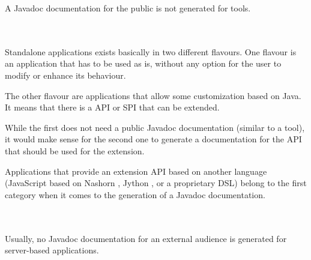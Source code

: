 A Javadoc documentation for the public is not generated for tools.

\paragraph{}\

Standalone applications exists basically in two different flavours. One flavour is an application that has to be used as is, without any option for the user to modify or enhance its behaviour. 

The other flavour are applications that allow some customization based on Java. It means that there is a API or SPI that can be extended.

While the first does not need a public Javadoc documentation (similar to a tool), it would make sense for the second one to generate a documentation for the API that should be used for the extension.

Applications that provide an extension API based on another language (JavaScript based on Nashorn \autocite{Nashorn}, Jython \autocite{Jython,Jython:GitHub}, or a proprietary DSL) belong to the first category when it comes to the generation of a Javadoc documentation.

\renewcommand{\cellalign}{tl}

\renewcommand{\cellalign}{tl}

\clearpage
\paragraph{}\

\renewcommand{\cellalign}{tl}

Usually, no Javadoc documentation for an external audience is generated for  server-based applications.

\clearpage
\paragraph{}\


